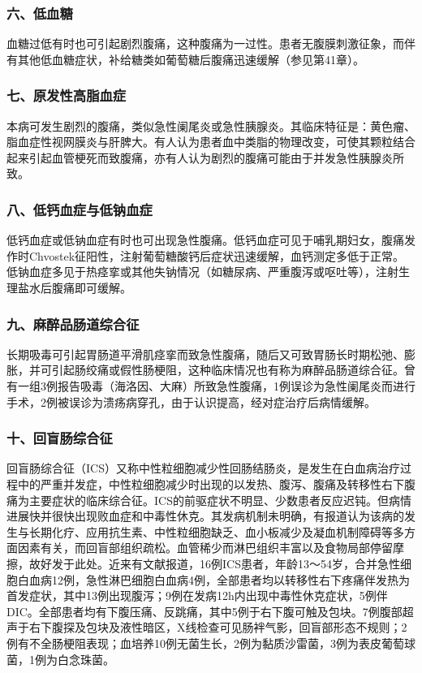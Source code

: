 \subsubsection{六、低血糖}

血糖过低有时也可引起剧烈腹痛，这种腹痛为一过性。患者无腹膜刺激征象，而伴有其他低血糖症状，补给糖类如葡萄糖后腹痛迅速缓解（参见第41章）。

\subsubsection{七、原发性高脂血症}

本病可发生剧烈的腹痛，类似急性阑尾炎或急性胰腺炎。其临床特征是：黄色瘤、脂血症性视网膜炎与肝脾大。有人认为患者血中类脂的物理改变，可使其颗粒结合起来引起血管梗死而致腹痛，亦有人认为剧烈的腹痛可能由于并发急性胰腺炎所致。

\subsubsection{八、低钙血症与低钠血症}

低钙血症或低钠血症有时也可出现急性腹痛。低钙血症可见于哺乳期妇女，腹痛发作时Chvostek征阳性，注射葡萄糖酸钙后症状迅速缓解，血钙测定多低于正常。低钠血症多见于热痉挛或其他失钠情况（如糖尿病、严重腹泻或呕吐等），注射生理盐水后腹痛即可缓解。

\subsubsection{九、麻醉品肠道综合征}

长期吸毒可引起胃肠道平滑肌痉挛而致急性腹痛，随后又可致胃肠长时期松弛、膨胀，并可引起肠绞痛或假性肠梗阻，这种临床情况也有称为麻醉品肠道综合征。曾有一组3例报告吸毒（海洛因、大麻）所致急性腹痛，1例误诊为急性阑尾炎而进行手术，2例被误诊为溃疡病穿孔，由于认识提高，经对症治疗后病情缓解。

\subsubsection{十、回盲肠综合征}

回盲肠综合征（ICS）又称中性粒细胞减少性回肠结肠炎，是发生在白血病治疗过程中的严重并发症，中性粒细胞减少时出现的以发热、腹泻、腹痛及转移性右下腹痛为主要症状的临床综合征。ICS的前驱症状不明显、少数患者反应迟钝。但病情进展快并很快出现败血症和中毒性休克。其发病机制未明确，有报道认为该病的发生与长期化疗、应用抗生素、中性粒细胞缺乏、血小板减少及凝血机制障碍等多方面因素有关，而回盲部组织疏松。血管稀少而淋巴组织丰富以及食物局部停留摩擦，故好发于此处。近来有文献报道，16例ICS患者，年龄13～54岁，合并急性细胞白血病12例，急性淋巴细胞白血病4例，全部患者均以转移性右下疼痛伴发热为首发症状，其中13例出现腹泻；9例在发病12h内出现中毒性休克症状，5例伴DIC。全部患者均有下腹压痛、反跳痛，其中5例于右下腹可触及包块。7例腹部超声于右下腹探及包块及液性暗区，X线检查可见肠袢气影，回盲部形态不规则；2例有不全肠梗阻表现；血培养10例无菌生长，2例为黏质沙雷菌，3例为表皮葡萄球菌，1例为白念珠菌。

